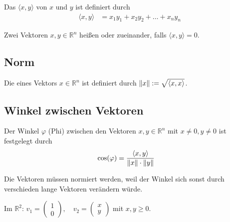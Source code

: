 Das  $\langle x, y\rangle$ von $x$ und $y$ ist definiert durch
\begin{align*}
    \langle x, y\rangle &= x_1y_1 + x_2y_2 + \dots + x_ny_n
\end{align*}

Zwei Vektoren $x, y \in \mathbb{R}^n$ heißen  oder  zueinander, falls $\langle x, y\rangle = 0$.

\subsection{Norm}
Die  eines Vektors $x \in \mathbb{R}^n$ ist definiert durch $\left\lVert x\right\rVert := \sqrt{\langle x, x\rangle}$.

\subsection{Winkel zwischen Vektoren}
Der Winkel $\varphi$ (Phi) zwischen den Vektoren $x, y \in \mathbb{R}^n$ mit $x\neq 0, y\neq 0$ ist festgelegt durch
\begin{align*}
    \text{cos}(\varphi) &= \frac{\langle x, y\rangle}{\left\lVert x\right\rVert\cdot\left\lVert y\right\rVert}
\end{align*}

\begin{center}
\end{center}
Die Vektoren müssen normiert werden, weil der Winkel sich sonst durch verschieden lange Vektoren verändern würde.

Im $\mathbb{R}^2$: $v_1 = \begin{pmatrix}1\\0\end{pmatrix},\quad v_2 = \begin{pmatrix}x\\y\end{pmatrix}$ mit $x, y \geq 0$.


